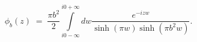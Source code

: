 \begin{equation}
\phi_b(z)\;=\;\frac{\pi b^2}{2}
\int\limits_{i0-\infty}^{i0+\infty}dw
\frac{e^{-i zw}}{\sinh(\pi w)
\sinh(\pi b^{2}w)}.
\end{equation}

